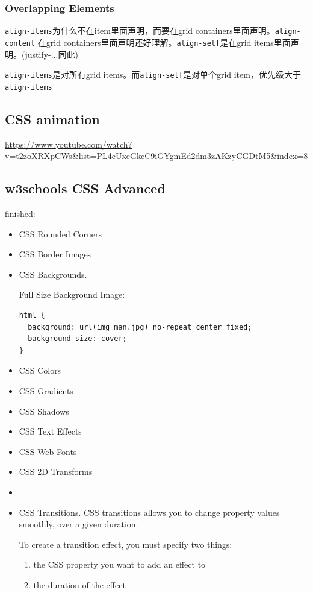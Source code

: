 \documentclass[a4paper, 12pt]{article}
\begin{document}
\subsubsection{Overlapping Elements}

\verb|align-items|为什么不在item里面声明，而要在grid containers里面声明。\verb|align-content| 在grid containers里面声明还好理解。\verb|align-self|是在grid items里面声明。(justify-...同此)

\verb|align-items|是对所有grid items。而\verb|align-self|是对单个grid item，优先级大于\verb|align-items|

\subsection{CSS animation}
\url{https://www.youtube.com/watch?v=t2zoXRXpCWs&list=PL4cUxeGkcC9iGYgmEd2dm3zAKzyCGDtM5&index=8}

\subsection{w3schools CSS Advanced}
\noindent finished:
\begin{itemize}
\item CSS Rounded Corners

\item CSS Border Images

\item CSS Backgrounds. 

Full Size Background Image:
\begin{verbatim}
html {
  background: url(img_man.jpg) no-repeat center fixed;
  background-size: cover;
}
\end{verbatim}

\item CSS Colors

\item CSS Gradients

\item CSS Shadows

\item CSS Text Effects

\item CSS Web Fonts

\item CSS 2D Transforms

\item 

\item CSS Transitions. CSS transitions allows you to change property values smoothly, over a given duration.

To create a transition effect, you must specify two things:
\begin{enumerate}
\item the CSS property you want to add an effect to

\item the duration of the effect

\end{enumerate}


\end{itemize}
\end{document}
